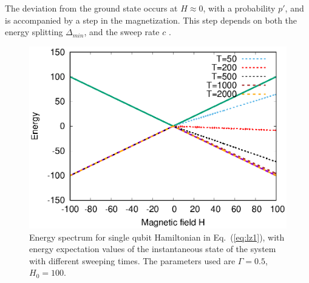 \documentclass[../main.tex]{subfiles}
\begin{document}
The deviation from the ground state occurs at $H \approx 0$, with a probability $p'$, and is accompanied by a step in the magnetization. This step depends on both the energy splitting  $\Delta_{min}$, and the sweep rate $c$ \cite{de1997theory}.\\
\begin{figure}[H]
\centering 
\includegraphics[scale=0.8]{EnergySpec_1spin_H100.eps}
\caption{Energy spectrum for single qubit Hamiltonian in Eq.~(\ref{eq:lz1}), with energy expectation values of the instantaneous state of the system with different sweeping times. The parameters used are $\Gamma=0.5$, $H_0=100$.}
\label{fig:lz1}
\end{figure}
\end{document}
